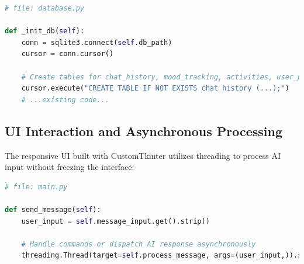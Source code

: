 \documentclass[12pt]{article}
\begin{document}
\begin{lstlisting}[language=Python, caption=Database Handler, label=lst:database]
# file: database.py

def _init_db(self):
    conn = sqlite3.connect(self.db_path)
    cursor = conn.cursor()
    
    # Create tables for chat_history, mood_tracking, activities, user_progress, and activity_notes
    cursor.execute("CREATE TABLE IF NOT EXISTS chat_history (...);")
    # ...existing code...
\end{lstlisting}

\subsection{UI Interaction and Asynchronous Processing}
The responsive UI built with CustomTkinter utilizes threading to process AI input without freezing the interface:

\begin{lstlisting}[language=Python, caption=Main Interface, label=lst:main]
# file: main.py

def send_message(self):
    user_input = self.message_input.get().strip()
    
    # Handle commands or dispatch AI response asynchronously
    threading.Thread(target=self.process_message, args=(user_input,)).start()
\end{lstlisting}
\end{document}
